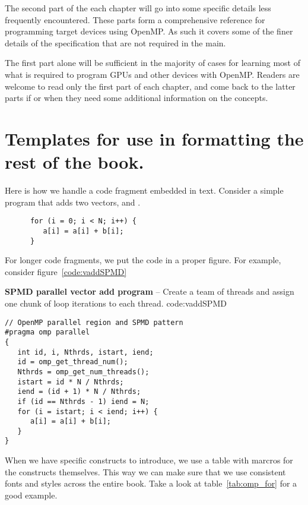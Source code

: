The second part of the each chapter will go into some specific details less frequently encountered.
These parts form a comprehensive reference for programming target devices using OpenMP.
As such it covers some of the finer details of the specification that are not required in the main.

The first part alone will be sufficient in the majority of cases for learning most of what is required to 
program GPUs and other devices with OpenMP. Readers are welcome to read only the first part of 
each chapter, and come back to the latter parts if or when they need some additional information on the concepts.


\section{Templates for use in formatting the rest of the book.}

Here is how we handle a code fragment embedded in text.
Consider a simple program that adds two vectors,  and .
\begin{verbatim}
      for (i = 0; i < N; i++) { 
         a[i] = a[i] + b[i];
      }
\end{verbatim}  

For longer code fragments, we put the code in a proper figure.  For example, consider figure~\ref{code:vaddSPMD}

\begin{CodeExample}%
{\textbf{SPMD parallel vector add program} -- \small
Create a team of threads and assign one chunk of loop iterations
to each thread.
}%
{code:vaddSPMD}
\begin{lstlisting}
// OpenMP parallel region and SPMD pattern
#pragma omp parallel
{
   int id, i, Nthrds, istart, iend;
   id = omp_get_thread_num();
   Nthrds = omp_get_num_threads(); 
   istart = id * N / Nthrds;
   iend = (id + 1) * N / Nthrds;
   if (id == Nthrds - 1) iend = N; 
   for (i = istart; i < iend; i++) {
      a[i] = a[i] + b[i];
   }
}
\end{lstlisting}
\end{CodeExample} 



When we have specific constructs to introduce, we use a table with marcros for the constructs themselves.  This way we can make 
sure that we use consistent fonts and styles across the entire book.  Take a look at table~\ref{tab:omp_for} for a good example.

